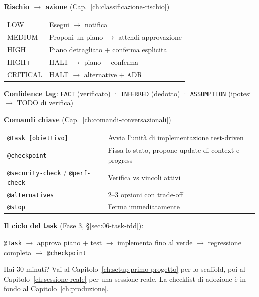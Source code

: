 \vspace{0.6em}
\noindent\textbf{Rischio $\rightarrow$ azione} \hfill {\small (Cap.~\ref{ch:classificazione-rischio})}

{\small
\begin{tabular}{ll}
\toprule
LOW & Esegui $\rightarrow$ notifica \\
MEDIUM & Proponi un piano $\rightarrow$ attendi approvazione \\
HIGH & Piano dettagliato + conferma esplicita \\
HIGH+ & HALT $\rightarrow$ piano + conferma \\
CRITICAL & HALT $\rightarrow$ alternative + ADR \\
\bottomrule
\end{tabular}}

\vspace{0.6em}
\noindent\textbf{Confidence tag}: \quad
{\small \texttt{FACT} (verificato) · \texttt{INFERRED} (dedotto) · \texttt{ASSUMPTION} (ipotesi $\rightarrow$ TODO di verifica)}

\vspace{0.6em}
\noindent\textbf{Comandi chiave} \hfill {\small (Cap.~\ref{ch:comandi-conversazionali})}

{\small
\begin{tabular}{ll}
\texttt{@Task [obiettivo]} & Avvia l'unità di implementazione test-driven \\
\texttt{@checkpoint} & Fissa lo stato, propone update di context e progress \\
\texttt{@security-check} / \texttt{@perf-check} & Verifica vs vincoli attivi \\
\texttt{@alternatives} & 2--3 opzioni con trade-off \\
\texttt{@stop} & Ferma immediatamente \\
\end{tabular}}

\vspace{0.6em}
\noindent\textbf{Il ciclo del task} (Fase 3, §\ref{sec:06-task-tdd}):

{\small \texttt{@Task} $\rightarrow$ approva piano + test $\rightarrow$ implementa fino al verde $\rightarrow$ regressione completa $\rightarrow$ \texttt{@checkpoint}}

\vspace{0.4em}
\begin{tipbox}
Hai 30 minuti? Vai al Capitolo~\ref{ch:setup-primo-progetto} per lo scaffold, poi al Capitolo~\ref{ch:sessione-reale} per una sessione reale. La checklist di adozione è in fondo al Capitolo~\ref{ch:produzione}.
\end{tipbox}
